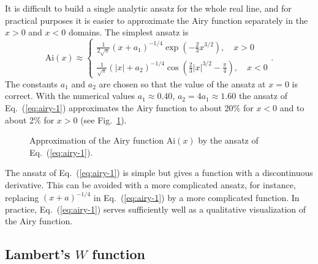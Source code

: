 \documentclass{llncs}
\begin{document}
It is difficult to build a single analytic ansatz for the whole real
line, and for practical purposes it is easier to approximate the Airy
function separately in the $x>0$ and $x<0$ domains. The simplest
ansatz is\begin{equation}
\textrm{Ai}\left(x\right)\approx \left\{ \begin{array}{l}
 \frac{1}{2\sqrt{\pi }}\left(x+a_{1}\right)^{-1/4}\exp \left(-\frac{2}{3}x^{3/2}\right),\quad x>0\\
 \frac{1}{\sqrt{\pi }}\left(\left|x\right|+a_{2}\right)^{-1/4}\cos \left(\frac{2}{3}\left|x\right|^{3/2}-\frac{\pi }{4}\right),\quad x<0\end{array}
\right..\label{eq:airy-1}\end{equation}
The constants $a_{1}$ and $a_{2}$ are chosen so that the value of
the ansatz at $x=0$ is correct. With the numerical values $a_{1}\approx 0.40$,
$a_{2}=4a_{1}\approx 1.60$ the ansatz of Eq.~(\ref{eq:airy-1})
approximates the Airy function to about 20\% for $x<0$ and to about
2\% for $x>0$ (see Fig.~\ref{cap:airy1}).

%
\begin{figure}[htbp]


\caption{Approximation of the Airy function $\textrm{Ai}\left(x\right)$ by
the ansatz of Eq.~(\ref{eq:airy-1}).\label{cap:airy1}}
\end{figure}


The ansatz of Eq.~(\ref{eq:airy-1}) is simple but gives a function
with a discontinuous derivative. This can be avoided with a more complicated
ansatz, for instance, replacing $\left(x+a\right)^{-1/4}$ in Eq.~(\ref{eq:airy-1})
by a more complicated function. In practice, Eq.~(\ref{eq:airy-1})
serves sufficiently well as a qualitative visualization of the Airy
function.


\subsection{Lambert's $W$ function}
\end{document}
